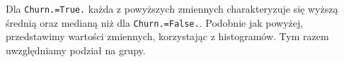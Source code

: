 \documentclass{article}\usepackage[]{graphicx}\usepackage[]{color}
\newenvironment{knitrout}{}{} %
\begin{document}
\begin{knitrout}
\begin{table}[!h]

\caption{\label{tab:Statystyki sumaryczne z podzialem na grupy}VMail.Message}
\centering
{}
\end{table}


\end{knitrout}

Dla \verb|Churn.=True.| każda z powyższych zmiennych charakteryzuje się wyższą średnią oraz medianą niż dla \verb|Churn.=False.|.
\vspace{0.3cm}
Podobnie jak powyżej, przedstawimy wartości zmiennych, korzystając z histogramów. Tym razem uwzględniamy podział na grupy.
\end{document}
